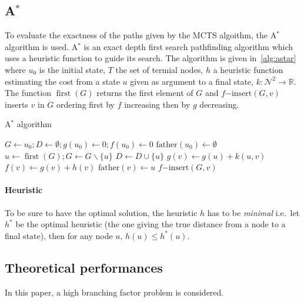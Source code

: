 \documentclass[oneside,twocolumn]{article}
\DeclareMathOperator{\first}{first}
\begin{document}
\subsection{A\(^*\)}
To evaluate the exactness of the paths given by the MCTS algoithm, the A\(^*\)
algorithm is used. A\(^*\) is an exact depth first search pathfinding algorithm
which uses a heuristic function to guide its search. The algorithm is given
in~\ref{alg:astar} where \(u_0\) is the initial state, \(T\) the set of termial
nodes, \(h\) a heuristic function estimating the cost from a state \(u\) given
as argument to a final state, \(k \colon \mathcal{N}^2 \to \mathbb{R}\). The
function \(\first(G)\) returns the first element of \(G\) and
\(f\mathup{-insert}(G, v)\) inserts \(v\) in \(G\) ordering first by \(f\)
increasing then by \(g\) decreasing.
\begin{algorithm}
  \caption{A\(^*\) algorithm~\cite{alliotschiex2002ia&it}}\label{alg:astar}
  \begin{algorithmic}
    \State{}\(G \gets u_0; D \gets \emptyset; g(u_0) \gets 0; f(u_0) \gets 0\)
    \State{}\(\mathup{father}(u_0) \gets \emptyset\)
    \State{}\(u \gets \first(G); G \gets G \backslash \{u\}\)
    \State{}\(D \gets D \cup \{u\}\)
    \State{}
    \EndIf{}
    \State{}\(g(v) \gets g(u) + k(u, v)\)
    \State{}\(f(v) \gets g(v) + h(v)\)
    \State{}\(\mathup{father}(v) \gets u\)
    \State{}\(f\mathup{-insert}(G, v)\)
    \EndIf{}
    \EndFor{}
    \EndWhile{}
    \EndProcedure{}
  \end{algorithmic}
\end{algorithm}

\paragraph{Heuristic}
To be sure to have the optimal solution, the heuristic \(h\) has to be
\emph{minimal} i.e.\ let \(h^*\) be the optimal heuristic (the one giving the
true distance from a node to a final state), then for any node \(u\), \(h(u)
\leq h^*(u)\).


\subsection{Theoretical performances}\label{ssec:theoretical_performances}
In this paper, a high branching factor problem is considered.
\end{document}
